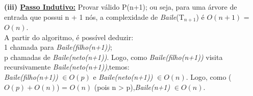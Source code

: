 \documentclass[a4paper]{article}
\begin{document}
\textbf{(iii) \underline{Passo Indutivo:}} Provar válido P(n+1); ou seja, para uma árvore de entrada que possui n + 1 nós, a complexidade de \emph{Baile}(T$_{n+1}$) é $O(n+1)$ = $O(n)$.\\
A partir do algoritmo, é possível deduzir:\\
1 chamada para \emph{Baile(filho(n+1))};\\
p chamadas de \emph{Baile(neto(n+1))}. Logo, como \emph{Baile(filho(n+1))} visita recursivamente \emph{Baile(neto(n+1))},temos:\\
\emph{Baile(filho(n+1))} $\in O(p)$ e \emph{Baile(neto(n+1))} $\in O(n)$. Logo, como ($O(p) + O(n)$) = $O(n)$ (pois n > p),\emph{Baile(n+1)} $\in O(n)$.
\end{document}
